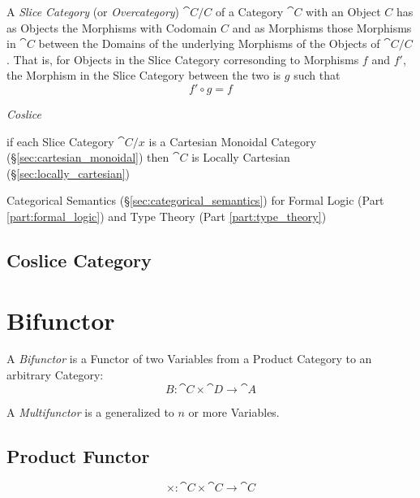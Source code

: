 A \emph{Slice Category} (or \emph{Overcategory}) $\cat{C}/C$ of a
Category $\cat{C}$ with an Object $C$ has as Objects the Morphisms
with Codomain $C$ and as Morphisms those Morphisms in $\cat{C}$
between the Domains of the underlying Morphisms of the Objects of
$\cat{C}/C$. That is, for Objects in the Slice Category corresonding
to Morphisms $f$ and $f'$, the Morphism in the Slice Category between
the two is $g$ such that
\[
  f' \circ g = f
\]

\emph{Coslice}

if each Slice Category $\cat{C}/x$ is a Cartesian Monoidal Category
(\S\ref{sec:cartesian_monoidal}) then $\cat{C}$ is Locally Cartesian
(\S\ref{sec:locally_cartesian})

Categorical Semantics (\S\ref{sec:categorical_semantics}) for Formal
Logic (Part \ref{part:formal_logic}) and Type Theory (Part
\ref{part:type_theory})



\subsection{Coslice Category}\label{sec:coslice_category}



\section{Bifunctor}\label{sec:bifunctor}

A \emph{Bifunctor} is a Functor of two Variables from a Product
Category to an arbitrary Category:
\[
  B : \cat{C} \times \cat{D} \rightarrow \cat{A}
\]

A \emph{Multifunctor} is a generalized to $n$ or more Variables.



\subsection{Product Functor}\label{sec:product_functor}

\[
  \times : \cat{C} \times \cat{C} \rightarrow \cat{C}
\]

